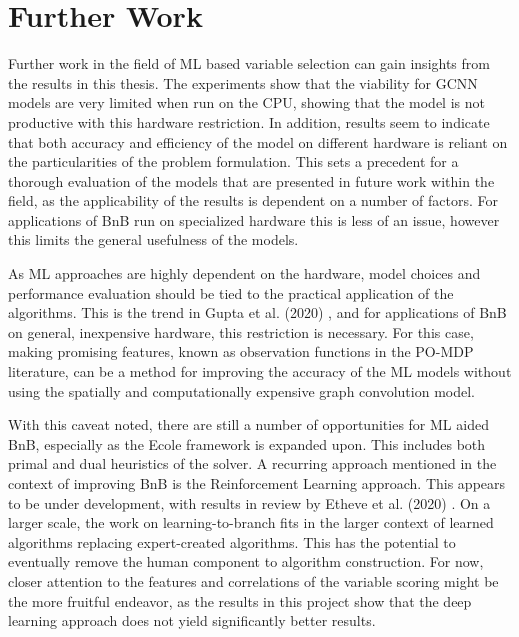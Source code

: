 \section{Further Work}\label{sec:disc_furtherwork}

Further work in the field of \gls{ML} based variable selection can gain insights from the results in this thesis.
The experiments show that the viability for \gls{GCNN} models are very limited when run on the \gls{CPU}, showing that the model is not productive with this hardware restriction. In addition, results seem to indicate that both accuracy and efficiency of the model on different hardware is reliant on the particularities of the problem formulation. This sets a precedent for a thorough evaluation of the models that are presented in future work within the field, as the applicability of the results is dependent on a number of factors. For applications of \gls{BnB} run on specialized hardware this is less of an issue, however this limits the general usefulness of the models. 

As \gls{ML} approaches are highly dependent on the hardware, model choices and performance evaluation should be tied to the practical application of the algorithms. This is the trend in Gupta et al. (2020) \cite{gupta2020hybrid}, and for applications of \gls{BnB} on general, inexpensive hardware, this restriction is necessary. For this case, making promising features, known as observation functions in the \gls{PO-MDP} literature, can be a method for improving the accuracy of the \gls{ML} models without using the spatially and computationally expensive graph convolution model. 

With this caveat noted, there are still a number of opportunities for \gls{ML} aided \gls{BnB}, especially as the \gls{Ecole} framework is expanded upon. This includes both primal and dual heuristics of the solver.
A recurring approach mentioned in the context of improving \gls{BnB} is the Reinforcement Learning approach. This appears to be under development, with results in review by Etheve et al. (2020) \cite{etheve2020reinforcement}. On a larger scale, the work on learning-to-branch fits in the larger context of learned algorithms replacing expert-created algorithms. This has the potential to eventually remove the human component to algorithm construction. For now, closer attention to the features and correlations of the variable scoring might be the more fruitful endeavor, as the results in this project show that the deep learning approach does not yield significantly better results. 

